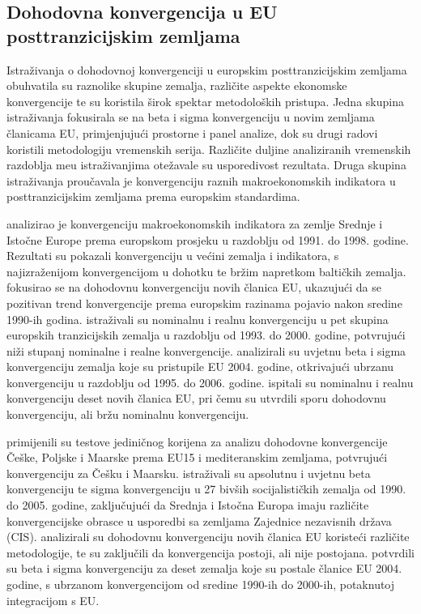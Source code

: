 \documentclass{crebsshr}
\begin{document}
\subsection{Dohodovna konvergencija u EU posttranzicijskim zemljama}
Istra\v{z}ivanja o dohodovnoj konvergenciji u europskim posttranzicijskim zemljama obuhvatila su raznolike skupine zemalja, razli\v{c}ite aspekte ekonomske konvergencije te su koristila \v{s}irok spektar metodolo\v{s}kih pristupa. Jedna skupina istra\v{z}ivanja fokusirala se na beta i sigma konvergenciju u novim zemljama \v{c}lanicama EU, primjenjuju\'ci prostorne i panel analize, dok su drugi radovi koristili metodologiju vremenskih serija. Razli\v{c}ite duljine analiziranih vremenskih razdoblja me\dj{}u istra\v{z}ivanjima ote\v{z}avale su usporedivost rezultata. Druga skupina istra\v{z}ivanja prou\v{c}avala je konvergenciju raznih makroekonomskih indikatora u posttranzicijskim zemljama prema europskim standardima.

\cite{kocenda:01} analizirao je konvergenciju makroekonomskih indikatora za zemlje Srednje i Isto\v{c}ne Europe prema europskom prosjeku u razdoblju od 1991. do 1998. godine. Rezultati su pokazali konvergenciju u ve\'cini zemalja i indikatora, s najizra\v{z}enijom konvergencijom u dohotku te br\v{z}im napretkom balti\v{c}kih zemalja.  \cite{dobrinsky:01} fokusirao se na dohodovnu konvergenciju novih \v{c}lanica EU, ukazuju\'ci da se pozitivan trend konvergencije prema europskim razinama pojavio nakon sredine 1990-ih godina. \cite{kutan-yigit:03} istra\v{z}ivali su nominalnu i realnu konvergenciju u pet skupina europskih tranzicijskih zemalja u razdoblju od 1993. do 2000. godine, potvr\dj{}uju\'ci ni\v{z}i stupanj nominalne i realne konvergencije. \cite{vojinovic-oplotnik:08} analizirali su uvjetnu beta i sigma konvergenciju zemalja koje su pristupile EU 2004. godine, otkrivaju\'ci ubrzanu konvergenciju u razdoblju od 1995. do 2006. godine. \cite{kocenda:06} ispitali su nominalnu i realnu konvergenciju deset novih \v{c}lanica EU, pri \v{c}emu su utvrdili sporu dohodovnu konvergenciju, ali br\v{z}u nominalnu konvergenciju.

\cite{brueggemann-trenkler:07} primijenili su testove jedini\v{c}nog korijena za analizu dohodovne konvergencije \v{C}e\v{s}ke, Poljske i Ma\dj{}arske prema EU15 i mediteranskim zemljama, potvr\dj{}uju\'ci konvergenciju za \v{C}e\v{s}ku i Ma\dj{}arsku. \cite{rapacki-prochniak:09} istra\v{z}ivali su apsolutnu i uvjetnu beta konvergenciju te sigma konvergenciju u 27 biv\v{s}ih socijalisti\v{c}kih zemalja od 1990. do 2005. godine, zaklju\v{c}uju\'ci da Srednja i Isto\v{c}na Europa imaju razli\v{c}ite konvergencijske obrasce u usporedbi sa zemljama Zajednice nezavisnih dr\v{z}ava (CIS). \cite{ingianni-zdarek:09} analizirali su dohodovnu konvergenciju novih \v{c}lanica EU koriste\'ci razli\v{c}ite metodologije, te su zaklju\v{c}ili da konvergencija postoji, ali nije postojana.  \cite{vojinovic:09} potvrdili su beta i sigma konvergenciju za deset zemalja koje su postale \v{c}lanice EU 2004. godine, s ubrzanom konvergencijom od sredine 1990-ih do 2000-ih, potaknutoj integracijom s EU.
\end{document}
